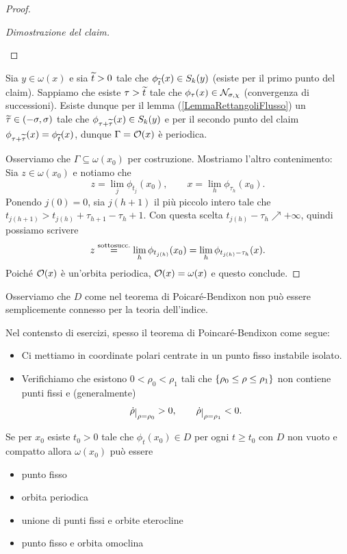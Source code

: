 \begin{proof}
\begin{proof}[Dimostrazione del claim]
\begin{itemize}
\end{itemize}
\setlength{\leftmargini}{0.5cm}
\end{proof}
\noindent
Sia $y\in \omega(x)$ e sia $\wt t>0$ tale che $\phi_{\wt t}(x)\in S_k(y)$ (esiste per il primo punto del claim). Sappiamo che esiste $\tau>\wt t$ tale che $\phi_{\tau}(x)\in \Nc_{\sigma,\chi}$ (convergenza di successioni). Esiste dunque per il lemma (\ref{LemmaRettangoliFlusso}) un $\wt \tau\in (-\sigma,\sigma)$ tale che $\phi_{\tau+\wt \tau}(x)\in S_k(y)$ e per il secondo punto del claim $\phi_{\tau+\wt\tau}(x)=\phi_{\wt t}(x)$, dunque $\Gamma=\Oc(x)$ \`e periodica.
\vspace{0.25cm}

\noindent
Osserviamo che $\Gamma\subseteq \omega(x_0)$ per costruzione. Mostriamo l'altro contenimento:\\
Sia $z\in \omega(x_0)$ e notiamo che 
\[z=\lim_j \phi_{t_j}(x_0),\qquad x=\lim_{h}\phi_{\tau_h}(x_0).\] 
Ponendo $j(0)=0$, sia $j(h+1)$ il pi\`u piccolo intero tale che $t_{j(h+1)}>t_{j(h)}+\tau_{h+1}-\tau_{h}+1$. Con questa scelta $t_{j(h)}-\tau_h\nearrow +\infty$, quindi possiamo scrivere 
\[z\pasgnl={sottosucc.}\lim_h \phi_{t_{j(h)}}(x_0)=\lim_h\phi_{t_{j(h)}-\tau_h}(x).\]
Poich\'e $\Oc(x)$ \`e un'orbita periodica, $\Oc(x)=\omega(x)$ e questo conclude.
\end{proof}

\begin{remark}
Osserviamo che $D$ come nel teorema di Poicar\'e-Bendixon non pu\`o essere semplicemente connesso per la teoria dell'indice.
\end{remark}

\begin{remark}
Nel contensto di esercizi, spesso il teorema di Poincar\'e-Bendixon come segue:
\begin{itemize}
\item Ci mettiamo in coordinate polari centrate in un punto fisso instabile isolato.
\item Verifichiamo che esistono $0<\rho_0<\rho_1$ tali che $\cpa{\rho_0\leq\rho\leq \rho_1}$ non contiene punti fissi e (generalmente) 
\[\dot\rho\res{\rho=\rho_0}>0,\qquad\dot \rho\res{\rho=\rho_1}<0.\]
\end{itemize}
\end{remark}

\begin{fact}
Se per $x_0$ esiste $t_0>0$ tale che $\phi_t(x_0)\in D$ per ogni $t\geq t_0$ con $D$ non vuoto e compatto allora $\omega(x_0)$ pu\`o essere
\begin{itemize}
\item punto fisso
\item orbita periodica
\item unione di punti fissi e orbite eterocline
\item punto fisso e orbita omoclina
\end{itemize}
\end{fact}

